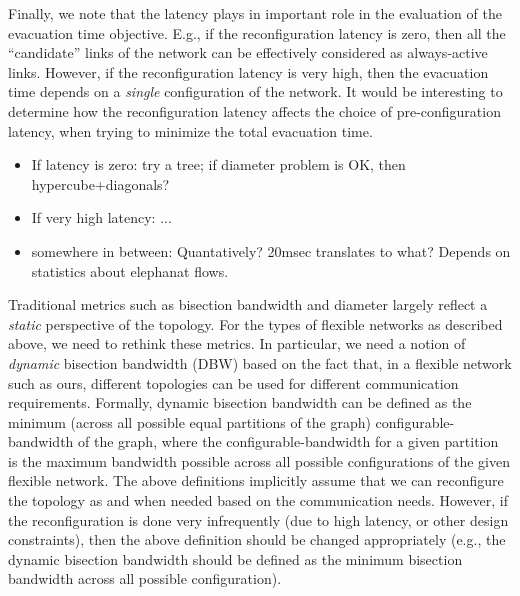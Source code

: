   Finally, we note that the
latency plays in important role in the evaluation of the evacuation
time objective. E.g., if the reconfiguration latency is zero, then all
the ``candidate'' links of the network can be effectively considered
as always-active links.  However, if the reconfiguration latency is
very high, then the evacuation time depends on a {\em single}
configuration of the network. It would be interesting to determine how
the reconfiguration latency affects the choice of pre-configuration
latency, when trying to minimize the total evacuation time. 

\begin{itemize}
\item
If latency is zero:   try a tree; if diameter problem is OK, then hypercube+diagonals?
\item
If very high latency: ...
\item
somewhere in between: Quantatively? 20msec translates to what? Depends on statistics about 
	elephanat flows.
\end{itemize}

Traditional metrics such as bisection bandwidth and diameter largely
reflect a {\em static} perspective of the topology. For the types of
flexible networks as described above, we need to rethink these
metrics. In particular, we need a notion of {\em dynamic} bisection
bandwidth (DBW) based on the fact that, in a flexible network such as
ours, different topologies can be used for different communication
requirements. Formally, dynamic bisection bandwidth can be defined as
the minimum (across all possible equal partitions of the graph)
configurable-bandwidth of the graph, where the configurable-bandwidth
for a given partition is the maximum bandwidth possible across all
possible configurations of the given flexible network.
%
The above definitions implicitly assume that we can reconfigure the
topology as and when needed based on the communication needs. However,
if the reconfiguration is done very infrequently (due to high latency,
or other design constraints), then the above definition should be
changed appropriately (e.g., the dynamic bisection bandwidth should be
defined as the minimum bisection bandwidth across all possible
configuration).


